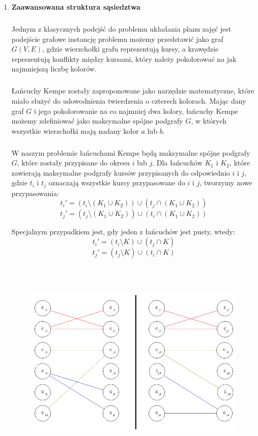 \begin{enumerate}
\begin{table}[H]
\caption {Plan po wykonaniu przykładowej zamiany}
\end{table} 

\item \textbf{Zaawansowana struktura sąsiedztwa} 
\subparagraph{}
Jednym z klasycznych podejść do problemu układania planu zajęć jest podejście grafowe instancję problemu możemy przedstawić jako graf $G(V, E)$, gdzie wierzchołki grafu reprezentują kursy, a krawędzie reprezentują konflikty między kursami, który należy pokolorować na jak najmniejszą liczbę kolorów. 
\subparagraph{}Łańcuchy Kempe zostały zaproponowane jako narzędzie matematyczne, które miało służyć do udowodnienia twierdzenia o czterech kolorach. Mając dany graf $G$ i jego pokolorowanie na co najmniej dwa kolory, łańcuchy Kempe możemy zdefiniować jako maksymalne spójne podgrafy $G$, w których wszystkie wierzchołki mają nadany kolor $a$ lub $b$.
\subparagraph{}W naszym problemie łańcuchami Kempe będą maksymalne spójne podgrafy $G$, które zostały przypisane do okresu $i$ lub $j$. Dla łańcuchów $K_1$ i $K_2$, które zawierają maksymalne podgrafy kursów przypisanych do odpowiednio $i$ i $j$, gdzie $t_i$ i $t_j$ oznaczają wszystkie kursy przypasowane do $i$ i $j$, tworzymy nowe przypasowania:
\[ t_i' = (t_i \setminus  (K_1 \cup K_2)) \cup (t_j \cap (K_1 \cup K_2)) \]
\[ t_j' = (t_j \setminus  (K_1 \cup K_2)) \cup (t_i \cap (K_1 \cup K_2)) \]

Specjalnym przypadkiem jest, gdy jeden z łańcuchów jest pusty, wtedy:
\[ t_i' = (t_i \setminus K) \cup (t_j \cap K)\]
\[ t_j' = (t_j \setminus K) \cup (t_i \cap K)\]



\begin{figure}[H]
\includegraphics[height=10cm]{kempeSwap.png}\hfill
\centering


\end{figure}
\end{enumerate}
